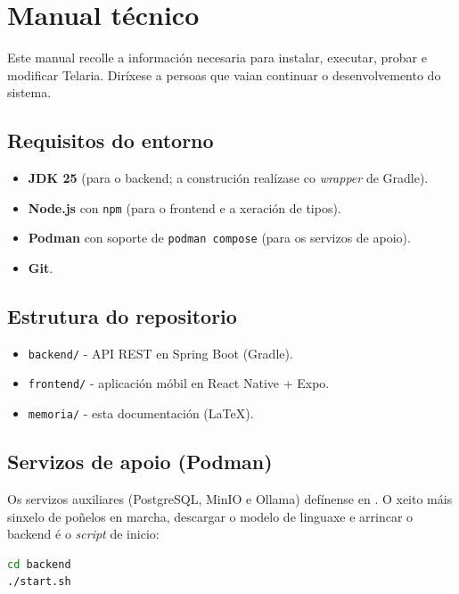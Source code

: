 \chapter{Manual técnico}

Este manual recolle a información necesaria para instalar, executar, probar e modificar
Telaria. Diríxese a persoas que vaian continuar o desenvolvemento do sistema.

\section{Requisitos do entorno}

\begin{itemize}
  \item \textbf{JDK 25} (para o backend; a construción realízase co \textit{wrapper} de Gradle).
  \item \textbf{Node.js} con \texttt{npm} (para o frontend e a xeración de tipos).
  \item \textbf{Podman} con soporte de \texttt{podman compose} (para os servizos de apoio).
  \item \textbf{Git}.
\end{itemize}

\section{Estrutura do repositorio}

\begin{itemize}
  \item \texttt{backend/} - API REST en Spring Boot (Gradle).
  \item \texttt{frontend/} - aplicación móbil en React Native + Expo.
  \item \texttt{memoria/} - esta documentación (LaTeX).
\end{itemize}

\section{Servizos de apoio (Podman)}

Os servizos auxiliares (PostgreSQL, MinIO e Ollama) defínense en
. O xeito máis sinxelo de poñelos en marcha, descargar o
modelo de linguaxe e arrincar o backend é o \textit{script} de inicio:

\begin{lstlisting}[language=bash]
cd backend
./start.sh
\end{lstlisting}

